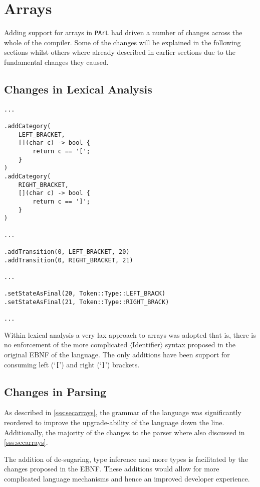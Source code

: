 \section{Arrays}

Adding support for arrays in \texttt{PArL} had driven a number
of changes across the whole of the compiler. Some of the changes
will be explained in the following sections whilst others where
already described in earlier sections due to the fundamental
changes they caused.

\subsection{Changes in Lexical Analysis}

\begin{lstlisting}[caption={Changes in the
\texttt{LexerDirector} for supporting left (`\texttt{[}') and
right (`\texttt{]}') brackets (lexer/LexerDirector.cpp).}]
...

.addCategory(
    LEFT_BRACKET,
    [](char c) -> bool {
        return c == '[';
    }
)
.addCategory(
    RIGHT_BRACKET,
    [](char c) -> bool {
        return c == ']';
    }
)

...

.addTransition(0, LEFT_BRACKET, 20)
.addTransition(0, RIGHT_BRACKET, 21)

...

.setStateAsFinal(20, Token::Type::LEFT_BRACK)
.setStateAsFinal(21, Token::Type::RIGHT_BRACK)

...
\end{lstlisting}


Within lexical analysis a very lax approach to arrays was
adopted that is, there is no enforcement of the more complicated
$\langle$Identifier$\rangle$ syntax proposed in the original
EBNF of the language. The only additions have been support for
consuming left (`\texttt{[}') and right (`\texttt{]}') brackets.

\subsection{Changes in Parsing}

As described in \ref{sss:secarrays}, the grammar of the language
was significantly reordered to improve the upgrade-ability of
the language down the line. Additionally, the majority of the
changes to the parser where also discussed in
\ref{sss:secarrays}.

\begin{todo}
The addition of de-sugaring, type inference and more types is
facilitated by the changes proposed in the EBNF. These additions
would allow for more complicated language mechanisms and hence
an improved developer experience.
\end{todo}

